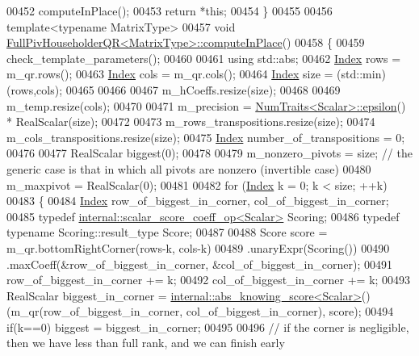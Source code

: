 \begin{DoxyCode}
00452   computeInPlace();
00453   \textcolor{keywordflow}{return} *\textcolor{keyword}{this};
00454 \}
00455 
00456 \textcolor{keyword}{template}<\textcolor{keyword}{typename} MatrixType>
00457 \textcolor{keywordtype}{void} \hyperlink{group___q_r___module_class_eigen_1_1_full_piv_householder_q_r}{FullPivHouseholderQR<MatrixType>::computeInPlace}()
00458 \{
00459   check\_template\_parameters();
00460 
00461   \textcolor{keyword}{using} std::abs;
00462   \hyperlink{namespace_eigen_a62e77e0933482dafde8fe197d9a2cfde}{Index} rows = m\_qr.rows();
00463   \hyperlink{namespace_eigen_a62e77e0933482dafde8fe197d9a2cfde}{Index} cols = m\_qr.cols();
00464   \hyperlink{namespace_eigen_a62e77e0933482dafde8fe197d9a2cfde}{Index} size = (std::min)(rows,cols);
00465 
00466   
00467   m\_hCoeffs.resize(size);
00468 
00469   m\_temp.resize(cols);
00470 
00471   m\_precision = \hyperlink{group___core___module_struct_eigen_1_1_num_traits}{NumTraits<Scalar>::epsilon}() * RealScalar(size);
00472 
00473   m\_rows\_transpositions.resize(size);
00474   m\_cols\_transpositions.resize(size);
00475   \hyperlink{namespace_eigen_a62e77e0933482dafde8fe197d9a2cfde}{Index} number\_of\_transpositions = 0;
00476 
00477   RealScalar biggest(0);
00478 
00479   m\_nonzero\_pivots = size; \textcolor{comment}{// the generic case is that in which all pivots are nonzero (invertible case)}
00480   m\_maxpivot = RealScalar(0);
00481 
00482   \textcolor{keywordflow}{for} (\hyperlink{namespace_eigen_a62e77e0933482dafde8fe197d9a2cfde}{Index} k = 0; k < size; ++k)
00483   \{
00484     \hyperlink{namespace_eigen_a62e77e0933482dafde8fe197d9a2cfde}{Index} row\_of\_biggest\_in\_corner, col\_of\_biggest\_in\_corner;
00485     \textcolor{keyword}{typedef} \hyperlink{struct_eigen_1_1internal_1_1scalar__score__coeff__op}{internal::scalar\_score\_coeff\_op<Scalar>} Scoring;
00486     \textcolor{keyword}{typedef} \textcolor{keyword}{typename} Scoring::result\_type Score;
00487 
00488     Score score = m\_qr.bottomRightCorner(rows-k, cols-k)
00489                       .unaryExpr(Scoring())
00490                       .maxCoeff(&row\_of\_biggest\_in\_corner, &col\_of\_biggest\_in\_corner);
00491     row\_of\_biggest\_in\_corner += k;
00492     col\_of\_biggest\_in\_corner += k;
00493     RealScalar biggest\_in\_corner = \hyperlink{struct_eigen_1_1internal_1_1abs__knowing__score}{internal::abs\_knowing\_score<Scalar>}()
      (m\_qr(row\_of\_biggest\_in\_corner, col\_of\_biggest\_in\_corner), score);
00494     \textcolor{keywordflow}{if}(k==0) biggest = biggest\_in\_corner;
00495 
00496     \textcolor{comment}{// if the corner is negligible, then we have less than full rank, and we can finish early}

\end{DoxyCode}
